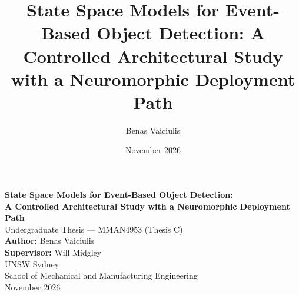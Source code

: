 \documentclass[11pt, a4paper]{report}
\title{State Space Models for Event-Based Object Detection: A Controlled Architectural Study with a Neuromorphic Deployment Path}
\author{Benas Vaiciulis}
\date{November 2026}
\begin{document}
\begin{titlepage}
    \centering
    \vspace*{1cm}
    \Large\textbf{State Space Models for Event-Based Object Detection:}\\[4pt]
    \Large\textbf{A Controlled Architectural Study with a Neuromorphic Deployment Path} \\
    \vspace{0.5cm}
    \large Undergraduate Thesis --- MMAN4953 (Thesis C) \\
    \vspace{1.5cm}
    \textbf{Author:} Benas Vaiciulis \\
    \textbf{Supervisor:} Will Midgley\\
    \vspace{1.5cm}
    UNSW Sydney \\
    School of Mechanical and Manufacturing Engineering \\
    \vfill
    November 2026
\end{titlepage}
\end{document}
